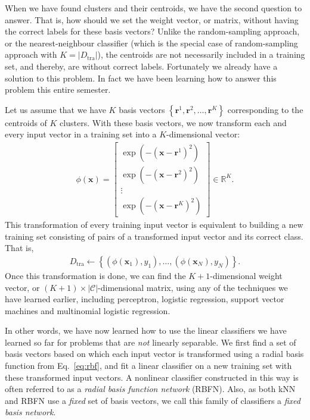 \documentclass{report}
\newcommand{\vect}[1]{\mathbf{#1}}
\newcommand{\vx}[0]{\vect{x}}
\newcommand{\vr}[0]{\vect{r}}
\newcommand{\RR}[0]{\mathbb{R}}
\newcommand{\tra}{\text{tra}}
\begin{document}
When we have found clusters and their centroids, we have the second question to
answer. That is, how should we set the weight vector, or matrix, without having
the correct labels for these basis vectors? Unlike the random-sampling approach,
or the nearest-neighbour classifier (which is the special case of
random-sampling approach with $K=|D_{\tra}|$), the centroids are not necessarily
included in a training set, and thereby, are without correct labels.
Fortunately we already have a solution to this problem. In fact we have been
learning how to answer this problem this entire semester. 

Let us assume that we have $K$ basis vectors $\left\{ \vr^1, \vr^2, \ldots,
\vr^K\right\}$ corresponding to the centroids of $K$ clusters. With these basis
vectors, we now transform each and every input vector in a training set into a
$K$-dimensional vector:
\begin{align*}
    \phi(\vx) = \left[
        \begin{array}{c}
            \exp\left( -(\vx - \vr^1)^2 \right) \\
            \exp\left( -(\vx - \vr^2)^2 \right) \\
            \vdots \\
            \exp\left( -(\vx - \vr^K)^2 \right) 
        \end{array}
    \right] \in \RR^K.
\end{align*}
This transformation of every training input vector is equivalent to building a
new training set consisting of pairs of a transformed input vector and its
correct class. That is,
\begin{align*}
    D_{\tra} \leftarrow \left\{
        (\phi(\vx_1), y_1), \ldots, (\phi(\vx_N), y_N)
    \right\}.
\end{align*}
Once this transformation is done, we can find the $K+1$-dimensional weight
vector, or $(K+1)\times |\mathcal{C}|$-dimensional matrix, using any of the
techniques we have learned earlier, including perceptron, logistic regression,
support vector machines and multinomial logistic regression. 

In other words, we have now learned how to use the linear classifiers we have
learned so far for problems that are {\it not} linearly separable. We first find
a set of basis vectors based on which each input vector is transformed using a
radial basis function from Eq.~\eqref{eq:rbf}, and fit a linear classifier on
a new training set with these transformed input vectors. A nonlinear classifier
constructed in this way is often referred to as a {\it radial basis function
network} (RBFN). Also, as both kNN and RBFN use a {\it fixed} set of basis
vectors, we call this family of classifiers a {\it fixed basis network}.
\end{document}
